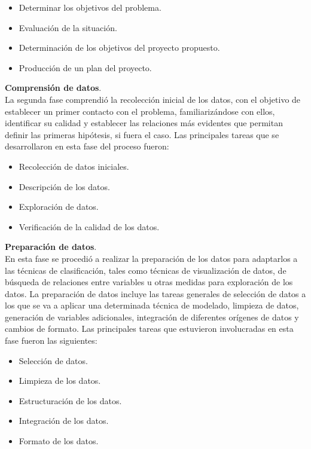 \begin{itemize}
\item	Determinar los objetivos del problema.
\item Evaluación de la situación.
\item	Determinación de los objetivos del proyecto propuesto.
\item	Producción de un plan del proyecto.\\
\end{itemize}


\noindent
\textbf{Comprensión de datos}.\\

	La segunda fase comprendió la recolección inicial de los  datos, con el objetivo de establecer un primer contacto con el problema, familiarizándose con ellos, identificar su calidad y establecer las relaciones más evidentes que permitan definir las primeras hipótesis, si fuera el caso. Las principales tareas que se desarrollaron en esta fase del proceso fueron:\\

\begin{itemize}
\item Recolección de datos iniciales.
\item Descripción de los datos.
\item Exploración de datos.
\item Verificación de la calidad de los datos.\\
\end{itemize}

\noindent
\textbf{Preparación de datos}.\\

En esta fase se procedió a realizar la preparación de los datos para adaptarlos a las técnicas de clasificación, tales como técnicas de visualización de datos, de búsqueda de relaciones entre variables u otras medidas para exploración de los datos. La preparación de datos incluye las tareas generales de selección de datos a los que se va a aplicar una determinada técnica de modelado, limpieza de datos, generación de variables adicionales, integración de diferentes orígenes de datos y cambios de formato. Las principales tareas que estuvieron involucradas en esta fase fueron las siguientes:\\

\begin{itemize}
\item	Selección de datos.
\item Limpieza de los datos.
\item	Estructuración de los datos.
\item	Integración de los datos.
\item	Formato de los datos.\\
\end{itemize}

